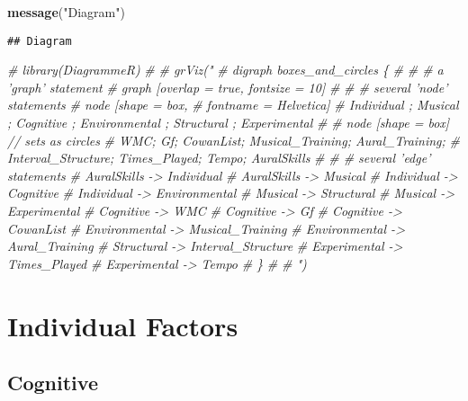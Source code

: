 \documentclass[]{book}
\newenvironment{Shaded}{\begin{snugshade}}{\end{snugshade}}
\newcommand{\CommentTok}[1]{\textcolor[rgb]{0.56,0.35,0.01}{\textit{#1}}}
\newcommand{\KeywordTok}[1]{\textcolor[rgb]{0.13,0.29,0.53}{\textbf{#1}}}
\newcommand{\NormalTok}[1]{#1}
\newcommand{\StringTok}[1]{\textcolor[rgb]{0.31,0.60,0.02}{#1}}
\theoremstyle{definition}
\theoremstyle{definition}
\theoremstyle{definition}
\theoremstyle{remark}
\begin{document}
\begin{Shaded}
\begin{Highlighting}[]
\KeywordTok{message}\NormalTok{(}\StringTok{"Diagram"}\NormalTok{)}
\end{Highlighting}
\end{Shaded}

\begin{verbatim}
## Diagram
\end{verbatim}

\begin{Shaded}
\begin{Highlighting}[]
\CommentTok{# library(DiagrammeR)}
\CommentTok{# }
\CommentTok{# grViz("}
\CommentTok{#      digraph boxes_and_circles \{}
\CommentTok{# }
\CommentTok{#   # a 'graph' statement}
\CommentTok{#   graph [overlap = true, fontsize = 10]}
\CommentTok{# }
\CommentTok{#   # several 'node' statements}
\CommentTok{#   node [shape = box,}
\CommentTok{#         fontname = Helvetica]}
\CommentTok{#   Individual ; Musical ; Cognitive ; Environmental ; Structural ; Experimental }
\CommentTok{# }
\CommentTok{#   node [shape = box] // sets as circles}
\CommentTok{#   WMC; Gf; CowanList; Musical_Training; Aural_Training; }
\CommentTok{#   Interval_Structure; Times_Played; Tempo; AuralSkills}
\CommentTok{# }
\CommentTok{#   # several 'edge' statements}
\CommentTok{#   AuralSkills -> Individual}
\CommentTok{#   AuralSkills -> Musical}
\CommentTok{#   Individual -> Cognitive}
\CommentTok{#   Individual -> Environmental}
\CommentTok{#   Musical -> Structural}
\CommentTok{#   Musical -> Experimental}
\CommentTok{#   Cognitive -> WMC}
\CommentTok{#   Cognitive -> Gf}
\CommentTok{#   Cognitive -> CowanList}
\CommentTok{#   Environmental -> Musical_Training}
\CommentTok{#   Environmental -> Aural_Training}
\CommentTok{#   Structural -> Interval_Structure }
\CommentTok{#   Experimental -> Times_Played}
\CommentTok{#   Experimental -> Tempo}
\CommentTok{# \} }
\CommentTok{#       }
\CommentTok{#       ")}
\end{Highlighting}
\end{Shaded}

\hypertarget{individual-factors}{%
\section{Individual Factors}\label{individual-factors}}

\hypertarget{cognitive}{%
\subsection{Cognitive}\label{cognitive}}
\end{document}
